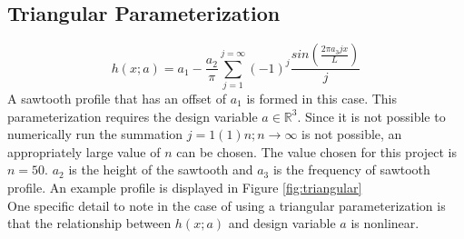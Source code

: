 \documentclass{article}
\begin{document}
\subsection{Triangular Parameterization}
\begin{equation}
h(x;a) = a_1 - \frac{a_2}{\pi}\sum_{j=1}^{j=\infty} (-1)^j \frac{sin(\frac{2\pi a_3jx}{L})}{j} 
\end{equation}
A sawtooth profile that has an offset of $a_1$ is formed in this case. This parameterization requires the design variable $a \in \mathbb{R}^3$. Since it is not possible to numerically run the summation $j=1(1)n; n\rightarrow \infty$ is not possible, an appropriately large value of $n$ can be chosen. The value chosen for this project is $n = 50$. $a_2$ is the height of the sawtooth and $a_3$ is the frequency of sawtooth profile. An example profile is displayed in Figure \ref{fig:triangular}\\
One specific detail to note in the case of using a triangular parameterization is that the relationship between $h(x;a)$ and design variable $a$ is nonlinear.
\end{document}
